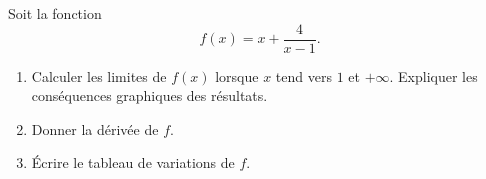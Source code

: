 
\begin{exercice}\label{exosmath-0283}

    Soit la fonction 
    \begin{equation}
        f(x)=x+\frac{ 4 }{ x-1 }.
    \end{equation}
    \begin{enumerate}
        \item
            Calculer les limites de \( f(x)\) lorsque \( x\) tend vers \( 1\) et \( +\infty\). Expliquer les conséquences graphiques des résultats.
        \item
            Donner la dérivée de \( f\).
        \item
            Écrire le tableau de variations de \( f\).
    \end{enumerate}

\end{exercice}
